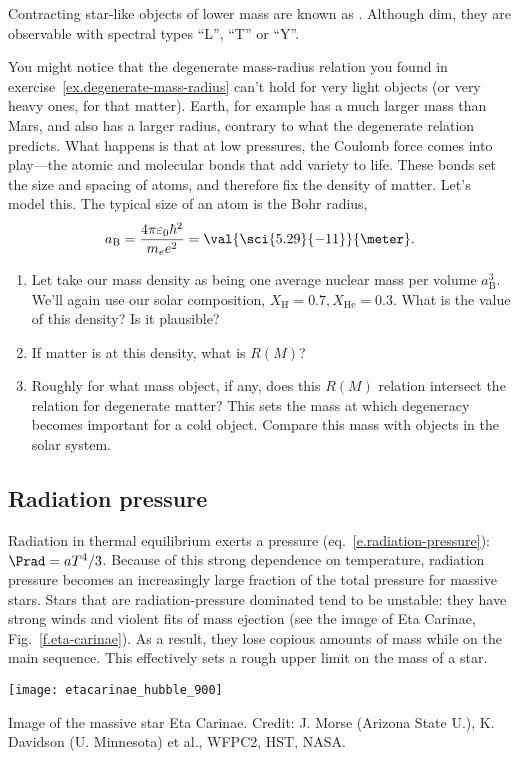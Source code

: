  Contracting star-like objects of lower mass are known as . Although dim, they are observable with spectral types ``L'', ``T'' or ``Y''\cite{Kirkpatrick1999Dwarfs-Cooler-t,Cushing2011The-Discovery-o}.

\begin{exercisebox}
\label{ex.planetary-M-and-R}
You might notice that the degenerate mass-radius relation you found in exercise~\ref{ex.degenerate-mass-radius} can't hold for very light objects (or very heavy ones, for that matter). Earth, for example has a much larger mass than Mars, and also has a larger radius, contrary to what the degenerate relation predicts. What happens is that at low pressures, the Coulomb force comes into play---the atomic and molecular bonds that add variety to life. These bonds set the size and spacing of atoms, and therefore fix the density of matter. Let's model this. The typical size of an atom is the Bohr radius,
\[
	a_{\mathrm{B}} = \frac{4\pi\varepsilon_{0}\hbar^{2}}{m_{e}e^{2}} = \val{\sci{5.29}{-11}}{\meter}.
\]
	\begin{enumerate}
	\item Let take our mass density as being one average nuclear mass per volume $a_{\mathrm{B}}^{3}$.  We'll again use our solar composition, $X_{\mathrm{H}}=0.7, X_{\mathrm{He}}=0.3$.
What is the value of this density? Is it plausible?
	\item If matter is at this density, what is $R(M)$?
	\item Roughly for what mass object, if any, does this $R(M)$ relation intersect the relation for degenerate matter? This sets the mass at which degeneracy becomes important for a cold object. Compare this mass with objects in the solar system.
	\end{enumerate}
\end{exercisebox}

\subsection{Radiation pressure}
\label{s.radiation-pressure}

Radiation in thermal equilibrium exerts a pressure (eq.~\ref{e.radiation-pressure}): $\Prad = aT^{4}/3$. Because of this strong dependence on temperature, radiation pressure becomes an increasingly large fraction of the total pressure for massive stars. Stars that are radiation-pressure dominated tend to be unstable: they have strong winds and violent fits of mass ejection (see the image of Eta Carinae, Fig.~\ref{f.eta-carinae}). As a result, they lose copious amounts of mass while on the main sequence. This effectively sets a rough upper limit on the mass of a star.
\begin{marginfigure}[-12\baselineskip]
\texttt{[image: etacarinae\_hubble\_900]}
\caption[Image of the massive star Eta Carinae]{\label{f.eta-carinae} Image of the massive star Eta Carinae. Credit: J. Morse (Arizona State U.), K. Davidson (U. Minnesota) et al., WFPC2, HST, NASA.}
\end{marginfigure}


